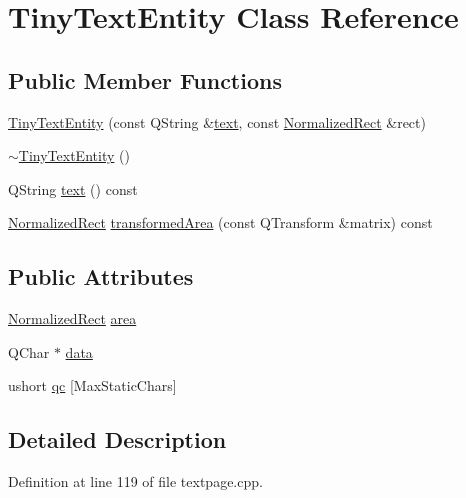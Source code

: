 \hypertarget{classTinyTextEntity}{\section{Tiny\+Text\+Entity Class Reference}
\label{classTinyTextEntity}
}
\subsection*{Public Member Functions}
\begin{DoxyCompactItemize}
\item 
\hyperlink{classTinyTextEntity_a99cdd1cd744d29ea5ed654baaea0a912}{Tiny\+Text\+Entity} (const Q\+String \&\hyperlink{classTinyTextEntity_a9657105c457630e898ea823ddc87d278}{text}, const \hyperlink{classOkular_1_1NormalizedRect}{Normalized\+Rect} \&rect)
\item 
\hyperlink{classTinyTextEntity_a455651d9b11b0ad7cc69a995236da587}{$\sim$\+Tiny\+Text\+Entity} ()
\item 
Q\+String \hyperlink{classTinyTextEntity_a9657105c457630e898ea823ddc87d278}{text} () const 
\item 
\hyperlink{classOkular_1_1NormalizedRect}{Normalized\+Rect} \hyperlink{classTinyTextEntity_ab00411672fde7036753f03bd1451d2fe}{transformed\+Area} (const Q\+Transform \&matrix) const 
\end{DoxyCompactItemize}
\subsection*{Public Attributes}
\begin{DoxyCompactItemize}
\item 
\hyperlink{classOkular_1_1NormalizedRect}{Normalized\+Rect} \hyperlink{classTinyTextEntity_a8b5dce783e679c307cfd36f67e2fb521}{area}
\item 
Q\+Char $\ast$ \hyperlink{classTinyTextEntity_af65797303229cd43e06863b51916a6af}{data}
\item 
ushort \hyperlink{classTinyTextEntity_a3a30dcf5d2436240002cd95ac1344a16}{qc} \mbox{[}Max\+Static\+Chars\mbox{]}
\end{DoxyCompactItemize}


\subsection{Detailed Description}


Definition at line 119 of file textpage.\+cpp.



